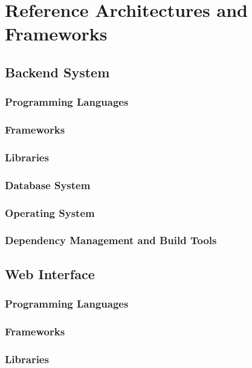 \documentclass[11pt,fleqn]{book} %
\begin{document}
	
	
	
	\chapter{Reference Architectures and Frameworks}
	
	\section{Backend System}
	\subsection{Programming Languages}
	\subsection{Frameworks}
	\subsection{Libraries}
	\subsection{Database System}
	\subsection{Operating System}
	\subsection{Dependency Management and Build Tools}
	\section{Web Interface}
	\subsection{Programming Languages}
	\subsection{Frameworks}
	\subsection{Libraries}
\end{document}
